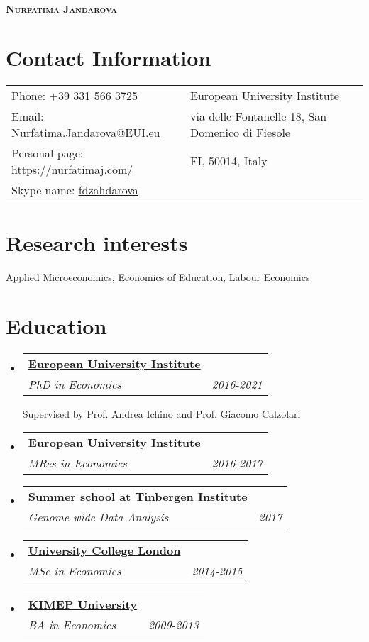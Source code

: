 \documentclass[a4, 11pt]{article}
\makeatletter
\newcommand{\resumeSubheading}[4]{
      \vspace{-2pt}\item
        \begin{tabular*}{0.97\textwidth}[t]{l@{\extracolsep{\fill}}r}
          \textbf{#1} & #2 \\
          \textit{\small#3} & \textit{\small #4} \\
        \end{tabular*}
    }
\newcommand{\resumeSubHeadingListStart}{\begin{itemize}[leftmargin=0.15in, label={}]}
\newcommand{\resumeSubHeadingListEnd}{\end{itemize}}
\makeatother
\begin{document}
    \begin{center}
        \textbf{\Huge \scshape Nurfatima Jandarova} \\ \vspace{1pt}
    \end{center}


    \section*{Contact Information}
    \begin{table}[H]
      \begin{tabular}{>{\raggedright\arraybackslash}p{0.5\linewidth}>{\raggedleft\arraybackslash}p{0.5\linewidth}}Phone: +39 331 566 3725 &\href{https://www.eui.eu/}{European University Institute}\\
          Email: \href{mailto:Nurfatima.Jandarova@EUI.eu}{Nurfatima.Jandarova@EUI.eu}
        & via delle Fontanelle 18, San Domenico di Fiesole\\
        Personal page: \href{https://nurfatimaj.com/}{https://nurfatimaj.com/} & FI, 50014, Italy\\
        Skype name: \href{skype:fdzahdarova?call}{fdzahdarova} &
      \end{tabular}
    \end{table}

    \section{Research interests}Applied Microeconomics, Economics of Education, Labour Economics

    \section{Education}\resumeSubHeadingListStart
          \resumeSubheading
            {\href{https://www.eui.eu}{European University Institute} }
            {}
            {PhD in Economics}
            { 2016-2021 }Supervised by Prof. Andrea Ichino and Prof. Giacomo Calzolari
          \resumeSubheading
            {\href{https://www.eui.eu}{European University Institute} }
            {}
            {MRes in Economics}
            { 2016-2017 }
          \resumeSubheading
            {\href{https://www.tinbergen.nl/home}{Summer school at Tinbergen Institute} }
            {}
            {Genome-wide Data Analysis}
            { 2017 }
          \resumeSubheading
            {\href{https://www.ucl.ac.uk}{University College London} }
            {}
            {MSc in Economics}
            { 2014-2015 }
          \resumeSubheading
            {\href{https://www.kimep.kz/en}{KIMEP University} }
            {}
            {BA in Economics}
            { 2009-2013 }
      \resumeSubHeadingListEnd
\end{document}
